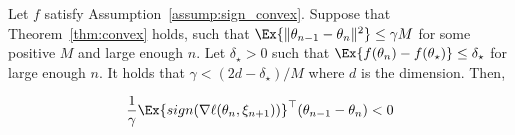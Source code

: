\documentclass[12pt]{article}
\begin{document}
\begin{theorem}
Let $f$ satisfy Assumption~\ref{assump:sign_convex}. 
Suppose that Theorem~\ref{thm:convex} holds, such that $\Ex{ \| \theta_{n-1} - \theta_n \|^2 } \leq \gamma M$ for some positive $M$ and large enough $n$.
Let $\delta_\star > 0$ such that $\Ex{ f( \theta_n ) - f( \theta_\star ) } \leq \delta_\star$ for large enough $n$.
It holds that $\gamma < (2d - \delta_\star) / M$ where $d$ is the dimension.
Then,

\begin{equation*}
\frac{1}{\gamma} \Ex{ sign( \nabla \ell( \theta_n, \xi_{n+1} ) ) }^\top ( \theta_{n-1} - \theta_n ) 
< 0
\end{equation*}
\end{theorem}
\end{document}
